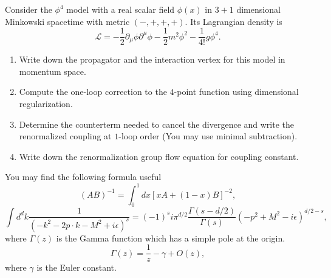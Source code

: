 \begin{exercise}
\label{physics:2026:5}
Consider the $\phi^4$ model with a real scalar field $\phi(x)$ in $3+1$ dimensional Minkowski spacetime with metric $(-,+,+,+)$. Its Lagrangian density is
\begin{equation}
    \mathcal L=-\frac{1}{2}\partial_\mu\phi\partial^\mu\phi-\frac{1}{2}m^2\phi^2-\frac{1}{4!}g\phi^4 . \tag{6}
\end{equation}

\begin{enumerate}
    \item Write down the propagator and the interaction vertex for this model in momentum space.
    \item Compute the one-loop correction to the $4$-point function using dimensional regularization.
    \item Determine the counterterm needed to cancel the divergence and write the renormalized coupling at $1$-loop order (You may use minimal subtraction).
    \item Write down the renormalization group flow equation for coupling constant.
\end{enumerate}
You may find the following formula useful
\begin{equation}
    (AB)^{-1}=\int_0^1dx[xA+(1-x)B]^{-2}, \tag{7}
\end{equation}
\begin{equation}
    \int d^dk\frac{1}{(-k^2-2p\cdot k-M^2+i\epsilon)^s}
    =
    (-1)^s i\pi^{d/2}
    \frac{\Gamma(s-d/2)}{\Gamma(s)}
    (-p^2+M^2-i\epsilon)^{d/2-s}, \tag{8}
\end{equation}
where $\Gamma(z)$ is the Gamma function which has a simple pole at the origin.
\begin{equation}
    \Gamma(z)=\frac{1}{z}-\gamma+O(z), \tag{9}
\end{equation}
where $\gamma$ is the Euler constant.
\end{exercise}

